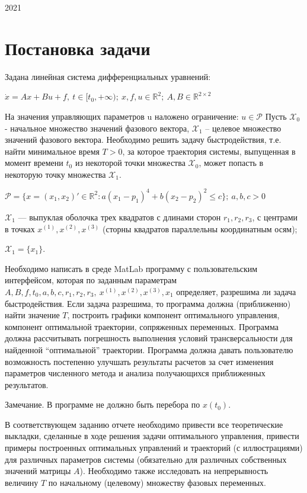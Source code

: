 \documentclass{article}
\theoremstyle{definition}
\begin{document}
\begin{center}
  2021
\end{center}

\newpage

\tableofcontents

\newpage

\section{Постановка задачи}
Задана линейная система дифференциальных уравнений:

$\dot x = Ax+Bu+f, ~t \in [t_0, +\infty);~ x,f,u \in \mathbb{R}^2;~
A,B \in \mathbb{R}^{2\times2}$

На значения управляющих параметров u наложено ограничение: $u \in \mathcal{P}$
Пусть $\mathcal{X}_0$ - начальное множество значений фазового вектора, $\mathcal{X}_1$
– целевое множество значений фазового вектора. 
Необходимо решить задачу быстродействия, т.е. найти минимальное время
$T > 0$, за которое траектория системы, выпущенная в момент времени $t_0$ 
из некоторой точки множества $\mathcal{X}_0$, может попасть в некоторую точку множества 
$\mathcal{X}_1$.

$\mathcal{P} = \{x = (x_1,x_2)' \in \mathbb{R}^2: a(x_1-p_1)^4+b(x_2-p_2)^2 \leqslant c\};~
a,b,c > 0$

$\mathcal{X}_1$ --- выпуклая оболочка трех квадратов с длинами сторон $r_1,r_2,r_3$, 
с центрами в точках $x^{(1)}, x^{(2)}, x^{(3)}$
(сторны квадратов параллельны координатным осям);

$\mathcal{X}_1 = \{x_1\}.$

Необходимо написать в среде MatLab программу с пользовательским интерфейсом, которая по
заданным параметрам $A, B, f, t_0, a, b, c, r_1, r_2, r_3,~ x^{(1)}, x^{(2)}, x^{(3)}, x_1$
определяет, разрешима ли задача быстродействия.
Если задача разрешима, то программа должна (приближенно) найти значение
$T$, построить графики компонент оптимального управления, компонент оптимальной траектории,
сопряженных переменных. Программа должна рассчитывать погрешность выполнения условий
трансверсальности для найденной “оптимальной” траектории.
Программа должна давать пользователю возможность постепенно улучшать результаты
расчетов за счет изменения параметров
численного метода и анализа получающихся приближенных результатов.

Замечание. В программе не должно быть перебора по $x(t_0)$.

В соответствующем заданию отчете необходимо привести все теоретические выкладки, сделанные
в ходе решения задачи оптимального управления, привести примеры построенных оптимальных
управлений и траекторий (с иллюстрациями) для различных параметров системы (обязательно для
различных собственных значений матрицы $A$). Необходимо также исследовать на непрерывность
величину $T$ по начальному (целевому) множеству фазовых переменных.
\end{document}
